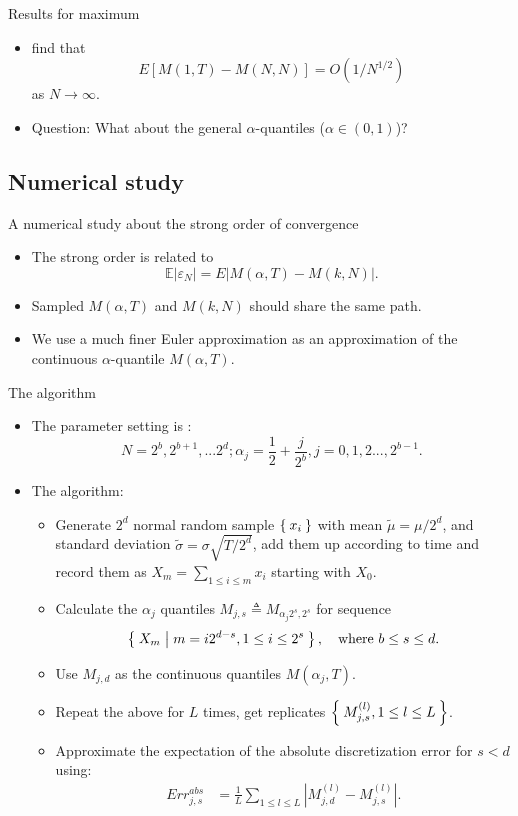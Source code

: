 \documentclass[cjk,10pt]{beamer}
\def\tmu{{\widetilde{\mu}}}
\def\tsigma{{\widetilde{\sigma}}}
\def\abs#1{{\left|#1\right|}}
\begin{document}
\begin{frame}{Results for maximum}
\begin{itemize}
\item
\cite{A-G-P-1995} find that \[E[M(1,T)-M(N,N)] = O(1/N^{1/2})\] as $N\to\infty$. 
\item
{\color{red} Question:} What about the general $\alpha$-quantiles ($\alpha \in (0,1)$)? 
\end{itemize}
\end{frame}

\subsection{Numerical study}
\begin{frame}{A numerical study about the strong order of convergence}
\begin{itemize}
\item
The strong order is related to 
\begin{equation}
\mathbb E|\varepsilon_N| =E|M(\alpha, T)-M(k,N)|.
\end{equation}
\item
Sampled $M(\alpha,T)$ and $M(k,N)$ should share the same path. 
\item
We use a much finer Euler approximation as an approximation of the continuous $\alpha$-quantile $M(\alpha, T)$. 
\end{itemize}
\end{frame}


\begin{frame}{The algorithm}
\small
\begin{itemize}
\item 
The parameter setting is : 
\begin{equation}
 N = 2^b , 2^{b+1} , ... 2^{d}; 
\alpha_j =  \frac{1}{2} + \frac{j}{2^b} , j = 0, 1 , 2..., 2^{b-1}.
\end{equation}
\item
The algorithm: 
\begin{itemize}
\item Generate $2^{d}$ normal random sample $\Set{x_i}$ 
  with mean $\tmu=\mu/2^d$,
  and standard deviation $\tsigma = \sigma \sqrt {{T}/{2^d}}$,
  add them up according to time and record them as
  $X_m = \sum_{1\leq i \leq m} x_i$ starting with $X_0$.
\item Calculate the $\alpha_j$ quantiles 
  $M_{j,s}\triangleq M_{\alpha_j 2^s,2^s}$ for sequence 
  \[
  \Set{X_m|m=i 2^{d-s}, 1\leq i\leq 2^{s}},\quad \text{where }b\leq s \leq d.\] 
\item Use $M_{j,d}$ as the continuous quantiles $M(\alpha_j,T)$.
\item Repeat the above for $L$ times,
  get replicates $\Set{M_{j,s}^{(l)},{1\leq l\leq L}}$.
\item Approximate the expectation of the absolute discretization error for $s < d$ using:
\begin{align}
Err^{abs}_{j,s} &= \frac{1}{L}\sum_{1\leq l \leq L} \abs{M_{j,d}^{(l)}- M_{j,s}^{(l)}}.
\end{align}
\end{itemize}
\end{itemize}
\end{frame}
\end{document}
